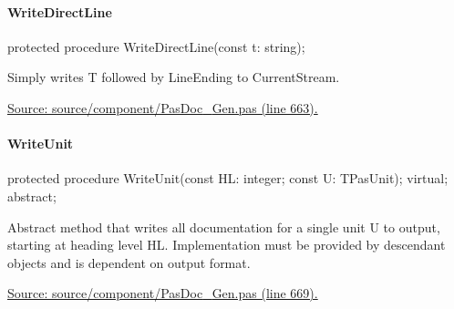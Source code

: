 \documentclass{report}
\newif\ifpdf
\begin{document}
\paragraph*{WriteDirectLine}\hspace*{\fill}

\label{PasDoc_Gen.TDocGenerator-WriteDirectLine}
\begin{list}{}{
\setlength{\itemindent}{0cm}
\setlength{\listparindent}{0cm}
\setlength{\leftmargin}{\evensidemargin}
\addtolength{\leftmargin}{\tmplength}
\settowidth{\labelsep}{X}
\addtolength{\leftmargin}{\labelsep}
\setlength{\labelwidth}{\tmplength}
}
\item[\textbf{Declaration}\hfill]
\ifpdf
\begin{flushleft}
\fi
\begin{ttfamily}
protected procedure WriteDirectLine(const t: string);\end{ttfamily}

\ifpdf
\end{flushleft}
\fi

\par
\item[\textbf{Description}]
Simply writes T followed by LineEnding to CurrentStream.\par
\href{https://github.com/pasdoc/pasdoc/blob/master/source/component/PasDoc_Gen.pas#L663}{Source: source/component/PasDoc{\_}Gen.pas (line 663).}

\end{list}
\paragraph*{WriteUnit}\hspace*{\fill}

\label{PasDoc_Gen.TDocGenerator-WriteUnit}
\begin{list}{}{
\setlength{\itemindent}{0cm}
\setlength{\listparindent}{0cm}
\setlength{\leftmargin}{\evensidemargin}
\addtolength{\leftmargin}{\tmplength}
\settowidth{\labelsep}{X}
\addtolength{\leftmargin}{\labelsep}
\setlength{\labelwidth}{\tmplength}
}
\item[\textbf{Declaration}\hfill]
\ifpdf
\begin{flushleft}
\fi
\begin{ttfamily}
protected procedure WriteUnit(const HL: integer; const U: TPasUnit); virtual; abstract;\end{ttfamily}

\ifpdf
\end{flushleft}
\fi

\par
\item[\textbf{Description}]
Abstract method that writes all documentation for a single unit U to output, starting at heading level HL. Implementation must be provided by descendant objects and is dependent on output format.\par
\href{https://github.com/pasdoc/pasdoc/blob/master/source/component/PasDoc_Gen.pas#L669}{Source: source/component/PasDoc{\_}Gen.pas (line 669).}

\end{list}
\end{document}
